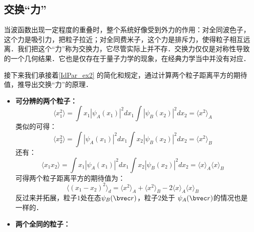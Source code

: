 \subsection{交换“力”}
当波函数出现一定程度的重叠时，整个系统好像受到外力的作用：对全同波色子，这个力是吸引力，把粒子拉近；对全同费米子，这个力是排斥力，使得粒子相互远离．我们把这个“力”称为交换力，它尽管实际上并不存．交换力仅仅是对称性导致的一个几何结果．它也是仅存在于量子力学的现象，在经典力学当中并没有对应．

接下来我们承接着\autoref{IdPar_ex2} 的简化和规定，通过计算两个粒子距离平方的期待值，推导出交换“力”的原理．

\begin{itemize}
\item \textbf{可分辨的两个粒子：}
\begin{equation}
\langle x_1^2\rangle = \int x_1|\psi_A(x_1)|^2dx_1\int |\psi_B(x_2)|^2dx_2=\langle x^2\rangle_A
\end{equation}
类似的可得：
\begin{equation}
\langle x_2^2\rangle = \int |\psi_A(x_1)|^2dx_1\int x_2 |\psi_B(x_2)|^2dx_2=\langle x^2\rangle_B
\end{equation}
还有：
\begin{equation}
\langle x_1x_2\rangle = \int  x_1|\psi_A(x_1)|^2dx_1\int x_2 |\psi_B(x_2)|^2dx_2=\langle x\rangle_A\langle x\rangle_B
\end{equation}
可得两个粒子距离平方的期待值为：
\begin{equation}
\langle (x_1-x_2)^2\rangle_d=\langle x^2\rangle_A+\langle x^2\rangle_B-2\langle x\rangle_A\langle x\rangle_B
\end{equation}
反过来并拓展，粒子$ 1 $处在态$\psi_B(\bvec r)$，粒子$ 2 $处于 $\psi_A(\bvec r)$的情况也是一样的．

\item \textbf{两个全同的粒子：}


\end{itemize}
